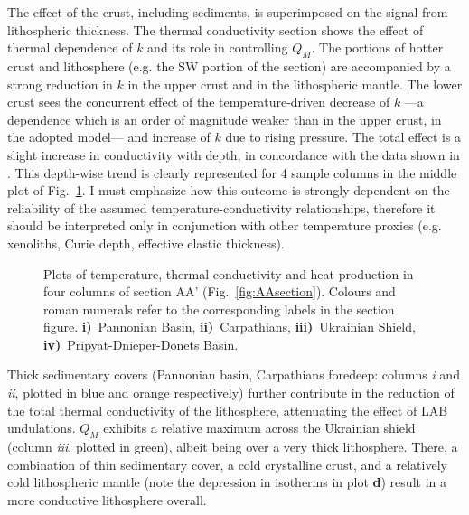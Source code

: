 The effect of the crust, including sediments, is superimposed on the signal from lithospheric thickness.
The thermal conductivity section shows the effect of thermal dependence of $k$ and its role in controlling $Q_M$.
The portions of hotter crust and lithosphere (e.g. the SW portion of the section) are accompanied by a strong reduction in $k$ in the upper crust and in the lithospheric mantle.
The lower crust sees the concurrent effect of the temperature-driven decrease of $k$ ---a dependence which is an order of magnitude weaker than in the upper crust, in the adopted \textcite{Chapman1986} model--- and increase of $k$ due to rising pressure.
The total effect is a slight increase in conductivity with depth, in concordance with the data shown in \textcite{Chapman1986}.
This depth-wise trend is clearly represented for 4 sample columns in the middle plot of Fig.~\ref{fig:AAsectionCols}.
I must emphasize how this outcome is strongly dependent on the reliability of the assumed temperature-conductivity relationships, therefore it should be interpreted only in conjunction with other temperature proxies (e.g. xenoliths, Curie depth, effective elastic thickness).

\begin{figure}
	\begin{adjustbox}{center}
	\end{adjustbox}
	\caption[Plots of temperature, thermal conductivity and heat production in four columns of section AA'.]{Plots of temperature, thermal conductivity and heat production in four columns of section AA' (Fig.~\ref{fig:AAsection}). Colours and roman numerals refer to the corresponding labels in the section figure.
	\textbf{i)}~Pannonian Basin, 
	\textbf{ii)}~Carpathians, 
	\textbf{iii)}~Ukrainian Shield, 
	\textbf{iv)}~Pripyat-Dnieper-Donets Basin.}
	\label{fig:AAsectionCols}
\end{figure}

Thick sedimentary covers (Pannonian basin, Carpathians foredeep: columns \textit{i} and \textit{ii}, plotted in blue and orange respectively) further contribute in the reduction of the total thermal conductivity of the lithosphere, attenuating the effect of LAB undulations.
$Q_M$ exhibits a relative maximum across the Ukrainian shield (column \textit{iii}, plotted in green), albeit being over a very thick lithosphere.
There, a combination of thin sedimentary cover, a cold crystalline crust, and a relatively cold lithospheric mantle (note the depression in isotherms in plot \textbf{d}) result in a more conductive lithosphere overall.

